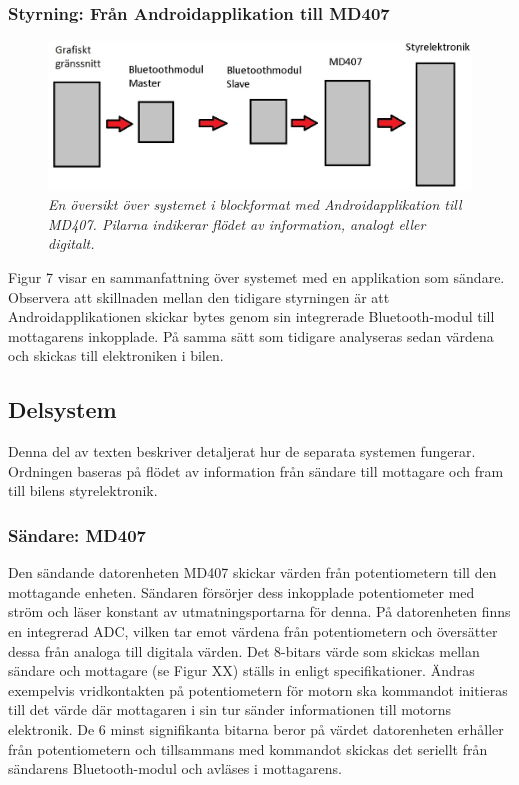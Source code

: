\documentclass[a4paper]{article}
\begin{document}
\subsubsection{Styrning: Från Androidapplikation till MD407}
\begin{figure}[H]
\includegraphics[width=\textwidth]{systemoversiktAndroid.jpg}
\centering
\caption{\it En översikt över systemet i blockformat med Androidapplikation till MD407. Pilarna indikerar flödet av information, analogt eller digitalt.}
\end{figure} 

Figur 7 visar en sammanfattning över systemet med en applikation som sändare. Observera att skillnaden mellan den tidigare styrningen är att Androidapplikationen skickar bytes genom sin integrerade Bluetooth-modul till mottagarens inkopplade. På samma sätt som tidigare analyseras sedan värdena och skickas till elektroniken i bilen.


\subsection{Delsystem}
Denna del av texten beskriver detaljerat hur de separata systemen fungerar. Ordningen baseras på flödet av information från sändare till mottagare och fram till bilens styrelektronik.




\subsubsection{Sändare: MD407}
Den sändande datorenheten MD407 skickar värden från potentiometern till den mottagande enheten. Sändaren försörjer dess inkopplade potentiometer med ström och läser konstant av utmatningsportarna för denna. På datorenheten finns en integrerad ADC, vilken tar emot värdena från potentiometern och översätter dessa från analoga till digitala värden. Det 8-bitars värde som skickas mellan sändare och mottagare (se Figur XX) ställs in enligt specifikationer. Ändras exempelvis vridkontakten på potentiometern för motorn ska kommandot initieras till det värde där mottagaren i sin tur sänder informationen till motorns elektronik. De 6 minst signifikanta bitarna beror på värdet datorenheten erhåller från potentiometern och tillsammans med kommandot skickas det seriellt från sändarens Bluetooth-modul och avläses i mottagarens.
\end{document}
